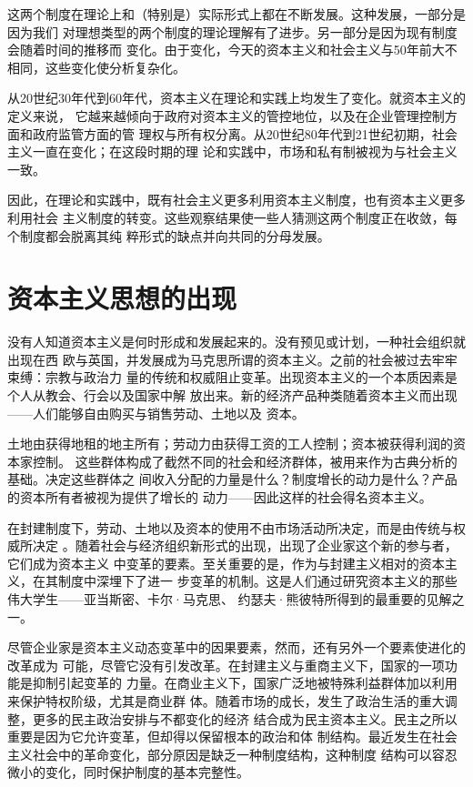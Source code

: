 这两个制度在理论上和（特别是）实际形式上都在不断发展。这种发展，一部分是因为我们
对理想类型的两个制度的理论理解有了进步。另一部分是因为现有制度会随着时间的推移而
变化。由于变化，今天的资本主义和社会主义与50年前大不相同，这些变化使分析复杂化。

从20世纪30年代到60年代，资本主义在理论和实践上均发生了变化。就资本主义的定义来说，
它越来越倾向于政府对资本主义的管控地位，以及在企业管理控制方面和政府监管方面的管
理权与所有权分离。从20世纪80年代到21世纪初期，社会主义一直在变化；在这段时期的理
论和实践中，市场和私有制被视为与社会主义一致。

因此，在理论和实践中，既有社会主义更多利用资本主义制度，也有资本主义更多利用社会
主义制度的转变。这些观察结果使一些人猜测这两个制度正在收敛，每个制度都会脱离其纯
粹形式的缺点并向共同的分母发展。

\section{资本主义思想的出现}


没有人知道资本主义是何时形成和发展起来的。没有预见或计划，一种社会组织就出现在西
欧与英国，并发展成为马克思所谓的资本主义。之前的社会被过去牢牢束缚：宗教与政治力
量的传统和权威阻止变革。出现资本主义的一个本质因素是个人从教会、行会以及国家中解
放出来。新的经济产品种类随着资本主义而出现——人们能够自由购买与销售劳动、土地以及
资本。

土地由获得地租的地主所有；劳动力由获得工资的工人控制；资本被获得利润的资本家控制。
这些群体构成了截然不同的社会和经济群体，被用来作为古典分析的基础。决定这些群体之
间收入分配的力量是什么？制度增长的动力是什么？产品的资本所有者被视为提供了增长的
动力——因此这样的社会得名资本主义。

在封建制度下，劳动、土地以及资本的使用不由市场活动所决定，而是由传统与权威所决定
。随着社会与经济组织新形式的出现，出现了企业家这个新的参与者，它们成为资本主义
中变革的要素。至关重要的是，作为与封建主义相对的资本主义，在其制度中深埋下了进一
步变革的机制。这是人们通过研究资本主义的那些伟大学生——亚当斯密、卡尔·马克思、
约瑟夫·熊彼特所得到的最重要的见解之一。

尽管企业家是资本主义动态变革中的因果要素，然而，还有另外一个要素使进化的改革成为
可能，尽管它没有引发改革。在封建主义与重商主义下，国家的一项功能是抑制引起变革的
力量。在商业主义下，国家广泛地被特殊利益群体加以利用来保护特权阶级，尤其是商业群
体。随着市场的成长，发生了政治生活的重大调整，更多的民主政治安排与不都变化的经济
结合成为民主资本主义。民主之所以重要是因为它允许变革，但却得以保留根本的政治和体
制结构。最近发生在社会主义社会中的革命变化，部分原因是缺乏一种制度结构，这种制度
结构可以容忍微小的变化，同时保护制度的基本完整性。

